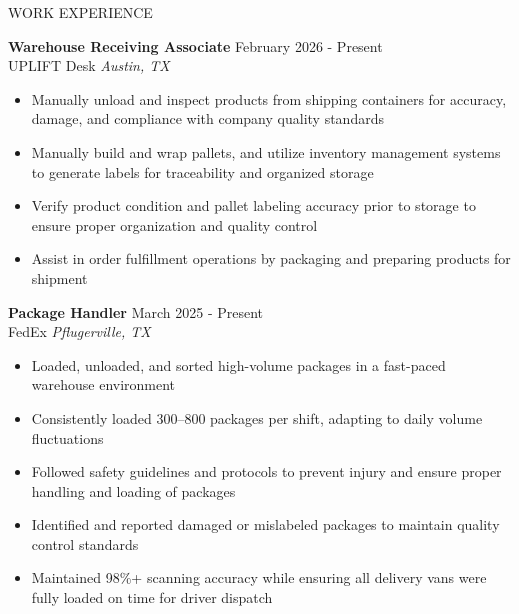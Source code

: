 \documentclass{resume} %
\begin{document}
%
%
%
%


\begin{rSection}{WORK EXPERIENCE}

\textbf{Warehouse Receiving Associate} \hfill February 2026 - Present \\
UPLIFT Desk \hfill \textit{Austin, TX}
 \begin{itemize}
    \itemsep -3pt {} 
      \item Manually unload and inspect products from shipping containers for accuracy, damage, and compliance with company quality standards
      \item Manually build and wrap pallets, and utilize inventory management systems to generate labels for traceability and organized storage
      \item Verify product condition and pallet labeling accuracy prior to storage to ensure proper organization and quality control
      \item Assist in order fulfillment operations by packaging and preparing products for shipment
 \end{itemize}
\textbf{Package Handler} \hfill March 2025 - Present \\
FedEx \hfill \textit{Pflugerville, TX}
 \begin{itemize}
    \itemsep -3pt {} 
    \item Loaded, unloaded, and sorted high-volume packages in a fast-paced warehouse environment  
    \item Consistently loaded 300–800 packages per shift, adapting to daily volume fluctuations  
   \item Followed safety guidelines and protocols to prevent injury and ensure proper handling and loading of packages  
   \item Identified and reported damaged or mislabeled packages to maintain quality control standards  
   \item Maintained 98\%+ scanning accuracy while ensuring all delivery vans were fully loaded on time for driver dispatch  
 \end{itemize}
 

\end{rSection}
\end{document}
